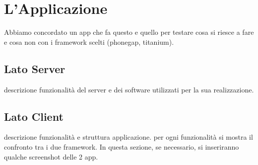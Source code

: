 \chapter{L'Applicazione}
	Abbiamo concordato un app che fa questo e quello per testare cosa si riesce
	a fare e cosa non con i framework scelti (phonegap, titanium).
	
	\section{Lato Server}
		descrizione funzionalità del server e dei software utilizzati per la sua
		realizzazione.
	
	\section{Lato Client}
		descrizione funzionalità e struttura applicazione. per ogni funzionalità
		si mostra il confronto tra i due framework. In questa sezione, se 
		necessario, si inseriranno qualche screenshot delle 2 app.

